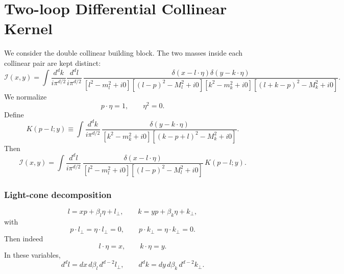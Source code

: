 \documentclass[11pt]{article}
\begin{document}
\section{Two-loop Differential Collinear Kernel}


We consider the double collinear building block.  The two masses inside each collinear pair are kept distinct:
\begin{equation}
\mathcal I(x,y)=
\int \frac{d^d k}{i\pi^{d/2}}\frac{d^d l}{i\pi^{d/2}}\,
\frac{\delta\!\left(x-l\!\cdot\!\eta\right)\delta\!\left(y-k\!\cdot\!\eta\right)}
{[l^2-m_l^2+i0][(l-p)^2-M_l^2+i0][k^2-m_k^2+i0][(l+k-p)^2-M_k^2+i0]}.
\label{eq:fullI}
\end{equation}
We normalize
\begin{equation}
p\!\cdot\!\eta=1,
\qquad \eta^2=0.
\label{eq:lightcone-normalization}
\end{equation}
Define
\begin{equation}
K(p-l;y)\equiv
\int \frac{d^d k}{i\pi^{d/2}}\,
\frac{\delta\!\left(y-k\!\cdot\!\eta\right)}
{[k^2-m_k^2+i0][(k-p+l)^2-M_k^2+i0]}.
\label{eq:Kdef}
\end{equation}
Then
\begin{equation}
\mathcal I(x,y)=
\int \frac{d^d l}{i\pi^{d/2}}\,
\frac{\delta\!\left(x-l\!\cdot\!\eta\right)}{[l^2-m_l^2+i0][(l-p)^2-M_l^2+i0]}
\,K(p-l;y).
\label{eq:I-via-K}
\end{equation}



\subsubsection{Light-cone decomposition}


\begin{equation}
l=xp+\beta_l\eta+l_\perp,
\qquad
k=yp+\beta_k\eta+k_\perp,
\label{eq:lck}
\end{equation}
with
\begin{equation}
p\cdot l_\perp=\eta\cdot l_\perp=0,
\qquad
p\cdot k_\perp=\eta\cdot k_\perp=0.
\label{eq:transverse-orthogonality}
\end{equation}
Then indeed
\begin{equation}
l\cdot\eta=x,
\qquad
k\cdot\eta=y.
\label{eq:delta-projections}
\end{equation}
In these variables,
\begin{equation}
d^d l=dx\,d\beta_l\,d^{d-2}l_\perp,
\qquad
d^d k=dy\,d\beta_k\,d^{d-2}k_\perp.
\label{eq:lightcone-measures}
\end{equation}
\end{document}
